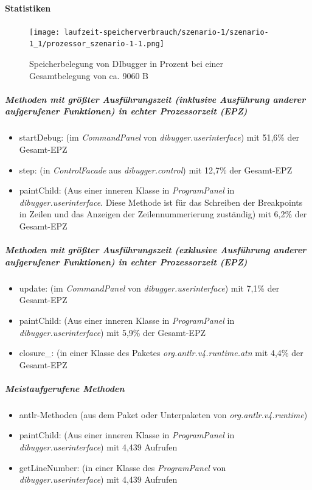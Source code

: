 \documentclass[parskip=full]{scrartcl}
\begin{document}
        \paragraph{Statistiken}
        \begin{figure}[!h]
            \centering
            \texttt{[image: laufzeit-speicherverbrauch/szenario-1/szenario-1\_1/prozessor\_szenario-1-1.png]}
            \caption{Speicherbelegung von DIbugger in Prozent bei einer Gesamtbelegung von ca. 9060 B}
        \end{figure}
        \subparagraph{Methoden mit größter Ausführungszeit (inklusive Ausführung anderer aufgerufener Funktionen) in echter Prozessorzeit (EPZ)}
        \begin{itemize}
            \item{startDebug}: (im \textit{CommandPanel} von \textit{dibugger.userinterface}) mit 51,6\% der Gesamt-EPZ
            \item{step}: (in \textit{ControlFacade} aus \textit{dibugger.control}) mit 12,7\% der Gesamt-EPZ
            \item{paintChild}: (Aus einer inneren Klasse in \textit{ProgramPanel} in \textit{dibugger.userinterface}. Diese Methode ist für das Schreiben der Breakpoints in Zeilen und das Anzeigen der Zeilennummerierung zuständig) mit 6,2\% der Gesamt-EPZ
        \end{itemize}
        \subparagraph{Methoden mit größter Ausführungszeit (exklusive Ausführung anderer aufgerufener Funktionen) in echter Prozessorzeit (EPZ)}
        \begin{itemize}
            \item{update}: (im \textit{CommandPanel} von \textit{dibugger.userinterface}) mit 7,1\% der Gesamt-EPZ 
            \item{paintChild}: (Aus einer inneren Klasse in \textit{ProgramPanel} in \textit{dibugger.userinterface}) mit 5,9\% der Gesamt-EPZ
            \item{closure\_}: (in einer Klasse des Paketes \textit{org.antlr.v4.runtime.atn} mit 4,4\% der Gesamt-EPZ
        \end{itemize}
        \subparagraph{Meistaufgerufene Methoden}
        \begin{itemize}
            \item{antlr-Methoden} (aus dem Paket oder Unterpaketen von \textit{org.antlr.v4.runtime}) 
            \item{paintChild}: (Aus einer inneren Klasse in \textit{ProgramPanel} in \textit{dibugger.userinterface}) mit 4,439 Aufrufen
            \item{getLineNumber}: (in einer Klasse des \textit{ProgramPanel} von \textit{dibugger.userinterface}) mit 4,439 Aufrufen
        \end{itemize}
\end{document}
